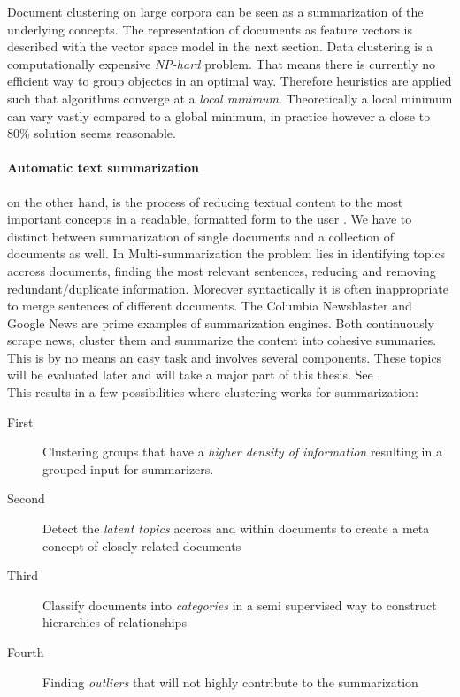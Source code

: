   Document clustering on large corpora can be seen as a summarization of the underlying concepts. The representation of documents as feature vectors is described with the vector space model in the next section. Data clustering is a computationally expensive \emph{NP-hard} problem. That means there is currently no efficient way to group objectcs in an optimal way. Therefore heuristics are applied such that algorithms converge at a  \emph{local minimum}. Theoretically a local minimum can vary vastly compared to a global minimum, in practice however a close to 80\% solution seems reasonable.

  \paragraph{Automatic text summarization} on the other hand, is the process of reducing textual content to the most important concepts in a readable, formatted form to the user \cite{SumEvaluation2001}. We have to distinct between summarization of single documents and a collection of documents as well. In Multi-summarization the problem lies in identifying topics accross documents, finding the most relevant sentences, reducing and removing redundant/duplicate information. Moreover syntactically it is often inappropriate to merge sentences of different documents. The Columbia Newsblaster and Google News are prime examples of summarization engines. Both continuously scrape news, cluster them and summarize the content into cohesive summaries. This is by no means an easy task and involves several components. These topics will be evaluated later and will take a major part of this thesis. See \cite{NewsBlaster2002, ColumbiaExperimentsSum2002}.\\
  This results in a few possibilities where clustering works for summarization:
  
  \begin{description}
    \item[First] Clustering groups that have a \emph{higher density of information} resulting in a grouped input for summarizers.
    \item[Second] Detect the \emph{latent topics} accross and within documents to create a meta concept of closely related documents
    \item[Third] Classify documents into \emph{categories} in a semi supervised way to construct hierarchies of relationships
    \item[Fourth] Finding \emph{outliers} that will not highly contribute to the summarization
  \end{description}

